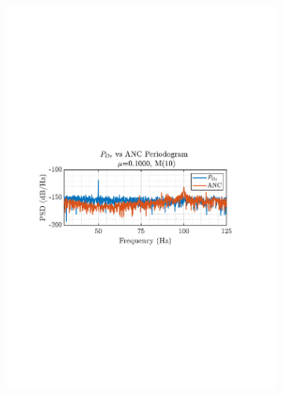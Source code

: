\documentclass[12pt]{article}
\numberwithin{equation}{section}
\begin{document}
\begin{figure}[H]
				\begin{subfigure}{0.49\textwidth}
					\centering
					\includegraphics[trim={2.2cm 11.2cm 3.15cm  11.2cm}, clip, width=\textwidth]{../MATLAB/figures/q2_3d_fig04.pdf} 
					\captionsetup{justification=centering}
				\end{subfigure}
				\begin{subfigure}{0.49\textwidth}
					\centering

\end{subfigure}
\end{figure}
\end{document}

